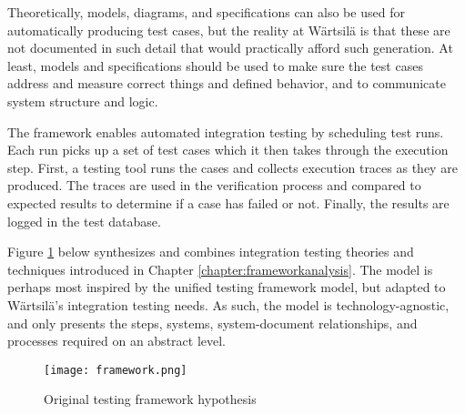 \documentclass[12pt,a4paper,oneside,pdftex]{report}
\begin{document}
{Theoretically, models, diagrams, and specifications can also be used for automatically producing test cases, but the reality at Wärtsilä is that these are not documented in such detail that would practically afford such generation. At least, models and specifications should be used to make sure the test cases address and measure correct things and defined behavior, and to communicate system structure and logic. 

The framework enables automated integration testing by scheduling test runs. Each run picks up a set of test cases which it then takes through the execution step. First, a testing tool runs the cases and collects execution traces as they are produced. The traces are used in the verification process and compared to expected results to determine if a case has failed or not. Finally, the results are logged in the test database.

Figure \ref{fig:framework} below synthesizes and combines integration testing theories and techniques introduced in Chapter \ref{chapter:frameworkanalysis}. The model is perhaps most inspired by the \citet{liu2009unified} unified testing framework model, but adapted to Wärtsilä's integration testing needs. As such, the model is technology-agnostic, and only presents the steps, systems, system-document relationships, and processes required on an abstract level.


\begin{figure}[H]
\centering
\texttt{[image: framework.png]}
\caption{Original testing framework hypothesis}
\label{fig:framework}
\end{figure}

\begin{comment}
\begin{figure}[H]
\centering
\pgfdeclarelayer{marx}
\pgfsetlayers{main,marx}
\xdefinecolor{lightgrey}{RGB}{220,220,220}
\xdefinecolor{blackish}{RGB}{30,30,30}
\begin{tikzpicture}[
    start chain=going below,    %
    node distance=6mm and 50mm, %
    ]
\tikzset{
  base/.style={draw, on chain, on grid, align=center, minimum height=4ex},
  proc/.style={base, rectangle, minimum height=4em, text width=7em},
  sut/.style={base, circle, text width=5em, fill = blackish, text = white},
  syst/.style={base, cylinder, shape border rotate=90,  aspect=.2, minimum height=5em, text width=5em},
  file/.style={base, rectangle, shape border rotate=90, minimum height=4em, text width=3em, fill = lightgrey},
  data/.style={base, trapezium, trapezium left angle=70, trapezium right angle=-70, minimum height=1cm}, 
  line/.style={draw, thick, -latex'},
  dots/.style={draw, dotted, -latex'}
}


\end{comment}}
\end{document}
